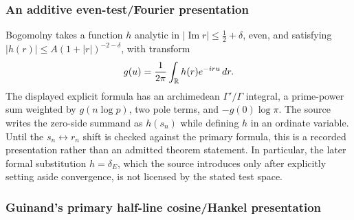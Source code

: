 \subsubsection{An additive even-test/Fourier presentation}

Bogomolny takes a function $h$ analytic in
$|\operatorname{Im}r|\leq \tfrac12+\delta$, even, and satisfying
$|h(r)|\leq A(1+|r|)^{-2-\delta}$, with transform
\cite[explicit-formula discussion]{bogomolny2007}
\begin{equation}
  g(u)=\frac1{2\pi}\int_{\mathbb R}h(r)e^{-iru}\,dr.
  \label{eq:bogomolny-fourier}
\end{equation}
The displayed explicit formula has an archimedean $\Gamma'/\Gamma$ integral, a prime-power
sum weighted by $g(n\log p)$, two pole terms, and $-g(0)\log\pi$.  The source writes the
zero-side summand as $h(s_n)$ while defining $h$ in an ordinate variable.  Until the
$s_n\leftrightarrow r_n$ shift is checked against the primary formula, this is a recorded
presentation rather than an admitted theorem statement.  In particular, the later formal
substitution $h=\delta_E$, which the source introduces only after explicitly setting aside
convergence, is not licensed by the stated test space.

\subsubsection{Guinand's primary half-line cosine/Hankel presentation}

